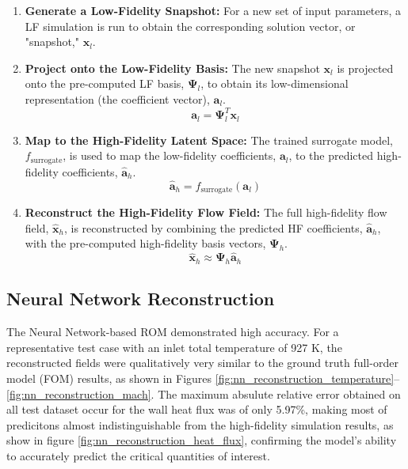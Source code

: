 \documentclass[tg, EN]{ufabcFHZh_tg}
\begin{document}
\begin{enumerate}
    \item \textbf{Generate a Low-Fidelity Snapshot:}
    For a new set of input parameters, a LF simulation is run to obtain the corresponding solution vector, or "snapshot," $\mathbf{x}_l$.

    \item \textbf{Project onto the Low-Fidelity Basis:}
    The new snapshot $\mathbf{x}_l$ is projected onto the pre-computed LF basis, $\mathbf{\Psi}_l$, to obtain its low-dimensional representation (the coefficient vector), $\mathbf{a}_l$.
    \begin{equation}
        \mathbf{a}_l = \mathbf{\Psi}_l^T \mathbf{x}_l
    \end{equation}

    \item \textbf{Map to the High-Fidelity Latent Space:}
    The trained surrogate model, $f_{\text{surrogate}}$, is used to map the low-fidelity coefficients, $\mathbf{a}_l$, to the predicted high-fidelity coefficients, $\hat{\mathbf{a}}_h$.
    \begin{equation}
        \hat{\mathbf{a}}_h = f_{\text{surrogate}}(\mathbf{a}_l)
    \end{equation}

    \item \textbf{Reconstruct the High-Fidelity Flow Field:}
    The full high-fidelity flow field, $\hat{\mathbf{x}}_h$, is reconstructed by combining the predicted HF coefficients, $\hat{\mathbf{a}}_h$, with the pre-computed high-fidelity basis vectors, $\mathbf{\Psi}_h$.
    \begin{equation}
        \hat{\mathbf{x}}_h \approx \mathbf{\Psi}_h \hat{\mathbf{a}}_h
    \end{equation}
\end{enumerate}


\subsection{Neural Network Reconstruction}

The Neural Network-based ROM demonstrated high accuracy. For a representative test case with an inlet total temperature of 927 K, the reconstructed fields were qualitatively very similar to the ground truth full-order model (FOM) results, as shown in Figures \ref{fig:nn_reconstruction_temperature}--\ref{fig:nn_reconstruction_mach}. The maximum absulute relative error obtained on all test dataset occur for the wall heat flux was of only 5.97\%, making most of predicitons almost indistinguishable from the high-fidelity simulation results, as show in figure \ref{fig:nn_reconstruction_heat_flux}, confirming the model's ability to accurately predict the critical quantities of interest.
\end{document}
